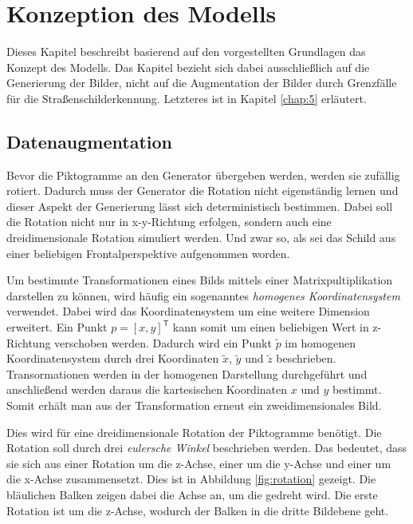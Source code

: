 \chapter{Konzeption des Modells}
\label{chap:konzept}

Dieses Kapitel beschreibt basierend auf den vorgestellten Grundlagen das Konzept des Modells. Das Kapitel bezieht sich dabei ausschließlich auf die Generierung der Bilder, nicht auf die Augmentation der Bilder durch Grenzfälle für die Straßenschilderkennung. Letzteres ist in Kapitel \ref{chap:5} erläutert.







\section{Datenaugmentation}
\label{chap:3-datenaugmentation}
Bevor die Piktogramme an den Generator übergeben werden, werden sie zufällig rotiert. Dadurch muss der Generator die Rotation nicht eigenständig lernen und dieser Aspekt der Generierung lässt sich deterministisch bestimmen. Dabei soll die Rotation nicht nur in x-y-Richtung erfolgen, sondern auch eine dreidimensionale Rotation simuliert werden. Und zwar so, als sei das Schild aus einer beliebigen Frontalperspektive aufgenommen worden.

Um bestimmte Transformationen eines Bilds mittels einer Matrixpultiplikation darstellen zu können, wird häufig ein sogenanntes \emph{homogenes Koordinatensystem} verwendet. Dabei wird das Koordinatensystem um eine weitere Dimension erweitert. Ein Punkt $p = [x, y]^\mathsf{T}$ kann somit um einen beliebigen Wert in z-Richtung verschoben werden. Dadurch wird ein Punkt $\tilde{p}$ im homogenen Koordinatensystem durch drei Koordinaten $\tilde{x}$, $\tilde{y}$ und $\tilde{z}$ beschrieben. Transormationen werden in der homogenen Darstellung durchgeführt und anschließend werden daraus die kartesischen Koordinaten $x$ und $y$ bestimmt. Somit erhält man aus der Transformation erneut ein zweidimensionales Bild. \cite{geometric-ops} \cite{math-primer}

Dies wird für eine dreidimensionale Rotation der Piktogramme benötigt. Die Rotation soll durch drei \emph{eulersche Winkel} beschrieben werden. Das bedeutet, dass sie sich aus einer Rotation um die z-Achse, einer um die y-Achse und einer um die x-Achse zusammensetzt. Dies ist in Abbildung \ref{fig:rotation} gezeigt. Die bläulichen Balken zeigen dabei die Achse an, um die gedreht wird. Die erste Rotation ist um die z-Achse, wodurch der Balken in die dritte Bildebene geht. \cite{math-primer}

